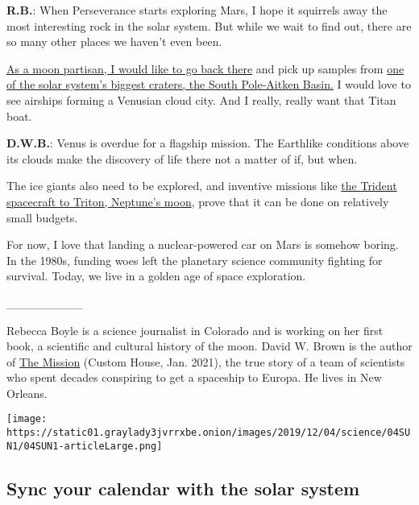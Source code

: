 \textbf{R.B.}: When Perseverance starts exploring Mars, I hope it
squirrels away the most interesting rock in the solar system. But while
we wait to find out, there are so many other places we haven't even
been.

\href{https://www.nytimes3xbfgragh.onion/2019/07/10/science/moon-facts.html}{As
a moon partisan, I would like to go back there} and pick up samples from
\href{https://www.nytimes3xbfgragh.onion/2020/02/26/science/china-moon-far-side.html}{one
of the solar system's biggest craters, the South Pole-Aitken Basin.} I
would love to see airships forming a Venusian cloud city. And I really,
really want that Titan boat.

\textbf{D.W.B.}: Venus is overdue for a flagship mission. The Earthlike
conditions above its clouds make the discovery of life there not a
matter of if, but when.

The ice giants also need to be explored, and inventive missions like
\href{https://www.nytimes3xbfgragh.onion/2019/03/19/science/triton-neptune-nasa-trident.html}{the
Trident spacecraft to Triton, Neptune's moon}, prove that it can be done
on relatively small budgets.

For now, I love that landing a nuclear-powered car on Mars is somehow
boring. In the 1980s, funding woes left the planetary science community
fighting for survival. Today, we live in a golden age of space
exploration.

\_\_\_\_\_\_\_\_\_

Rebecca Boyle is a science journalist in Colorado and is working on her
first book, a scientific and cultural history of the moon. David W.
Brown is the author of \href{https://amzn.to/35rcgRE}{The Mission}
(Custom House, Jan. 2021), the true story of a team of scientists who
spent decades conspiring to get a spaceship to Europa. He lives in New
Orleans.

\href{https://www.nytimes3xbfgragh.onion/interactive/2020/science/2020-astronomy-space-calendar.html}{}

\texttt{[image: https://static01.graylady3jvrrxbe.onion/images/2019/12/04/science/04SUN1/04SUN1-articleLarge.png]}

\hypertarget{sync-your-calendar-with-the-solar-system}{%
\subsection{Sync your calendar with the solar
system}\label{sync-your-calendar-with-the-solar-system}}

